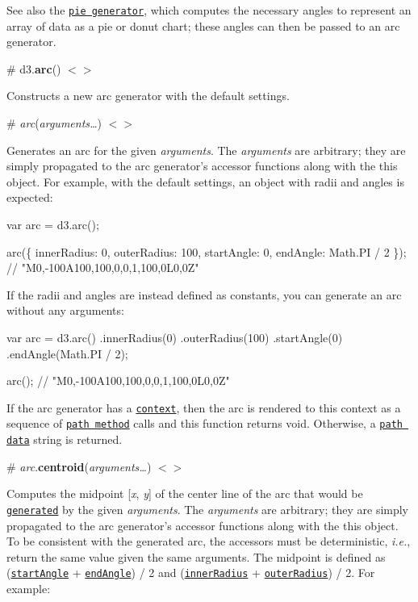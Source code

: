 See also the \href{#pies}{\tt pie generator}, which computes the necessary angles to represent an array of data as a pie or donut chart; these angles can then be passed to an arc generator.

\label{_arc}%
\# d3.{\bfseries arc}() \href{https://github.com/d3/d3-shape/blob/master/src/arc.js}{\tt $<$$>$}

Constructs a new arc generator with the default settings.

\label{__arc}%
\# {\itshape arc}({\itshape arguments…}) \href{https://github.com/d3/d3-shape/blob/master/src/arc.js#L89}{\tt $<$$>$}

Generates an arc for the given {\itshape arguments}. The {\itshape arguments} are arbitrary; they are simply propagated to the arc generator’s accessor functions along with the {\ttfamily this} object. For example, with the default settings, an object with radii and angles is expected\+:


\begin{DoxyCode}
var arc = d3.arc();

arc(\{
  innerRadius: 0,
  outerRadius: 100,
  startAngle: 0,
  endAngle: Math.PI / 2
\}); // "M0,-100A100,100,0,0,1,100,0L0,0Z"
\end{DoxyCode}


If the radii and angles are instead defined as constants, you can generate an arc without any arguments\+:


\begin{DoxyCode}
var arc = d3.arc()
    .innerRadius(0)
    .outerRadius(100)
    .startAngle(0)
    .endAngle(Math.PI / 2);

arc(); // "M0,-100A100,100,0,0,1,100,0L0,0Z"
\end{DoxyCode}


If the arc generator has a \href{#arc_context}{\tt context}, then the arc is rendered to this context as a sequence of \href{http://www.w3.org/TR/2dcontext/#canvaspathmethods}{\tt path method} calls and this function returns void. Otherwise, a \href{http://www.w3.org/TR/SVG/paths.html#PathData}{\tt path data} string is returned.

\label{_arc_centroid}%
\# {\itshape arc}.{\bfseries centroid}({\itshape arguments…}) \href{https://github.com/d3/d3-shape/blob/master/src/arc.js#L224}{\tt $<$$>$}

Computes the midpoint \mbox{[}{\itshape x}, {\itshape y}\mbox{]} of the center line of the arc that would be \href{#_arc}{\tt generated} by the given {\itshape arguments}. The {\itshape arguments} are arbitrary; they are simply propagated to the arc generator’s accessor functions along with the {\ttfamily this} object. To be consistent with the generated arc, the accessors must be deterministic, {\itshape i.\+e.}, return the same value given the same arguments. The midpoint is defined as (\href{#arc_startAngle}{\tt start\+Angle} + \href{#arc_endAngle}{\tt end\+Angle}) / 2 and (\href{#arc_innerRadius}{\tt inner\+Radius} + \href{#arc_outerRadius}{\tt outer\+Radius}) / 2. For example\+:

